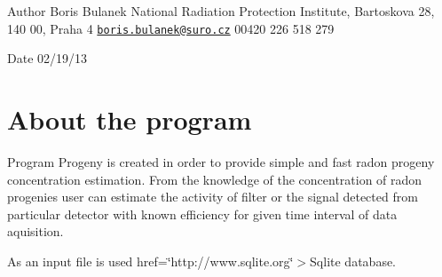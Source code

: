 \begin{DoxyAuthor}{Author}
Boris Bulanek  National Radiation Protection Institute, Bartoskova 28, 140 00, Praha 4  \href{mailto:boris.bulanek@suro.cz}{\tt boris.\+bulanek@suro.\+cz}  00420 226 518 279 
\end{DoxyAuthor}
\begin{DoxyDate}{Date}
02/19/13
\end{DoxyDate}
\hypertarget{index_about}{}\section{About the program}\label{index_about}
Program Progeny is created in order to provide simple and fast radon progeny concentration estimation. From the knowledge of the concentration of radon progenies user can estimate the activity of filter or the signal detected from particular detector with known efficiency for given time interval of data aquisition.

As an input file is used href=\char`\"{}http\+://www.\+sqlite.\+org\char`\"{}$>$Sqlite database.

